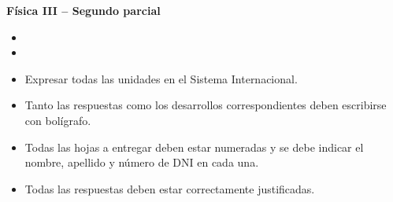 \documentclass[addpoints]{exam}
\begin{document}
\renewcommand{\tablename}{Tabla}


\begin{tcolorbox}[colback=white,arc=0mm,colframe=black]
    \begin{center}
        \Large\textbf{Física III -- Segundo parcial}
    \end{center}
\end{tcolorbox}

\begin{itemize}
    \item {}
    \item {}
\end{itemize}

\begin{tcolorbox}[colback=black!5!white,arc=0mm,breakable,pad at break*=1mm,colframe=black!25!white,title=\textbf{\textcolor{black}{Instrucciones generales}}]
    \begin{itemize}
        \item Expresar todas las unidades en el Sistema Internacional.
        \item Tanto las respuestas como los desarrollos correspondientes deben escribirse con bolígrafo.
        \item Todas las hojas a entregar deben estar numeradas y se debe indicar el nombre, apellido y número de DNI en cada una.
        \item Todas las respuestas deben estar correctamente justificadas.
    \end{itemize}
\end{tcolorbox}
\end{document}
